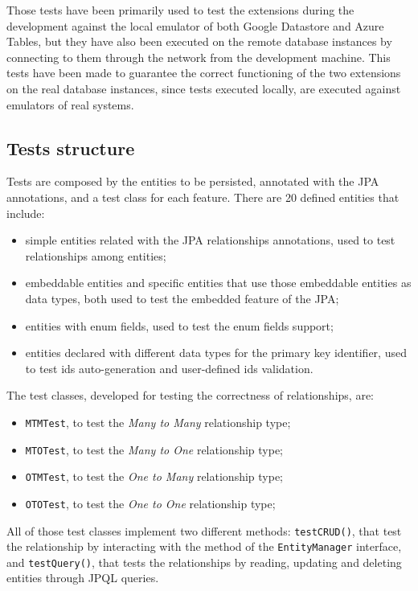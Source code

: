 \noindent Those tests have been primarily used to test the extensions during the development against the local emulator of both Google Datastore and Azure Tables, but they have also been executed on the remote database instances by connecting to them through the network from the development machine. This tests have been made to guarantee the correct functioning of the two extensions on the real database instances, since tests executed locally, are executed against emulators of real systems.

\subsection{Tests structure}
Tests are composed by the entities to be persisted, annotated with the JPA annotations, and a test class for each feature.
There are 20 defined entities that include:
\begin{itemize}
\item simple entities related with the JPA relationships annotations, used to test relationships among entities;
\item embeddable entities and specific entities that use those embeddable entities as data types, both used to test the embedded feature of the JPA;
\item entities with enum fields, used to test the enum fields support;
\item entities declared with different data types for the primary key identifier, used to test ids auto-generation and user-defined ids validation.
\end{itemize}

\noindent The test classes, developed for testing the correctness of relationships, are:
\begin{itemize}
\item \texttt{MTMTest}, to test the \textit{Many to Many} relationship type;
\item \texttt{MTOTest}, to test the \textit{Many to One} relationship type;
\item \texttt{OTMTest}, to test the \textit{One to Many} relationship type;
\item \texttt{OTOTest}, to test the \textit{One to One} relationship type;
\end{itemize}
\noindent All of those test classes implement two different methods: \texttt{testCRUD()}, that test the relationship by interacting with the method of the \texttt{EntityManager} interface, and \texttt{testQuery()}, that tests the relationships by reading, updating and deleting entities through JPQL queries.

